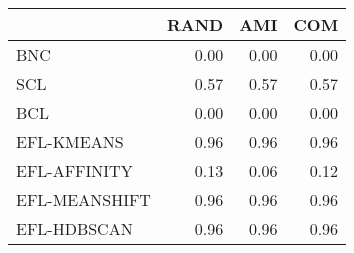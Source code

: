 \begin{tabular}{lrrr}
\toprule
 & RAND & AMI & COM \\
\midrule
BNC & 0.00 & 0.00 & 0.00 \\
SCL & 0.57 & 0.57 & 0.57 \\
BCL & 0.00 & 0.00 & 0.00 \\
EFL-KMEANS & 0.96 & 0.96 & 0.96 \\
EFL-AFFINITY & 0.13 & 0.06 & 0.12 \\
EFL-MEANSHIFT & 0.96 & 0.96 & 0.96 \\
EFL-HDBSCAN & 0.96 & 0.96 & 0.96 \\
\bottomrule
\end{tabular}
